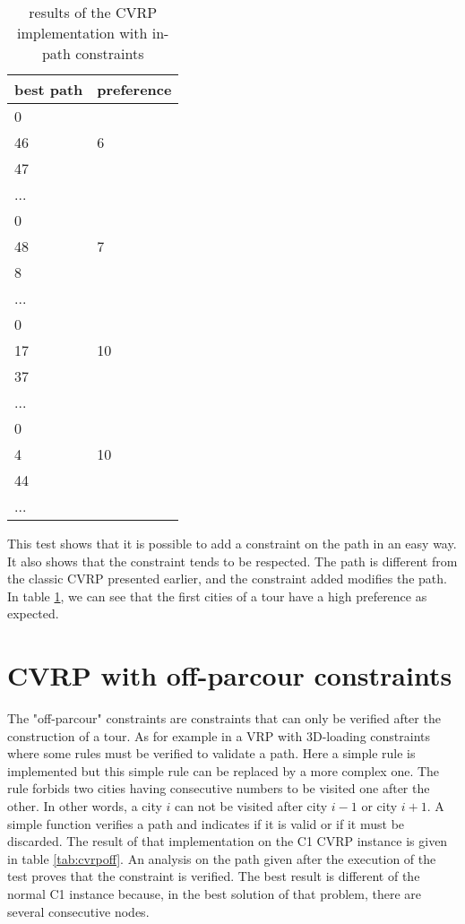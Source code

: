 \begin{table}
\centering
\begin{tabular}{|l|l|}
\hline
best path & preference \\
\hline
\hline
 0 & \\
 46 & 6\\
 47 & \\
 ... &\\
 0 & \\
 48& 7\\
 8& \\
 ...&\\
 0 & \\
 17 &10 \\
 37& \\
 ...&\\
 0 & \\
 4 & 10 \\
 44& \\
 ...&\\
\hline
\end{tabular}
\caption{results of the CVRP implementation with in-path constraints}
\label{tab:path}
\end{table}

This test shows that it is possible to add a constraint on the path in an easy way. It also shows that the constraint tends to be respected. The path is different from the classic CVRP presented earlier, and the constraint added modifies the path. In table \ref{tab:path}, we can see that the first cities of a tour have a high preference as expected.

\section{CVRP with off-parcour constraints}
The "off-parcour" constraints are constraints that can only be verified after the construction of a tour. As for example in a VRP with 3D-loading constraints where some rules must be verified to validate a path. Here a simple rule is implemented but this simple rule can be replaced by a more complex one. The rule forbids two cities having consecutive numbers to be visited one after the other. In other words, a city $i$ can not be visited after city $i-1$ or city $i+1$. A simple function verifies a path and indicates if it is valid or if it must be discarded. The result of that implementation on the C1 CVRP instance is given in table \ref{tab:cvrpoff}. An analysis on the path given after the execution of the test proves that the constraint is verified. The best result is different of the normal C1 instance because, in the best solution of that problem, there are several consecutive nodes.

